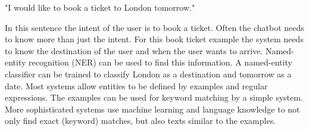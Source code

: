 \begin{center}
"I would like to book a ticket to London tomorrow."
\end{center}

In this sentence the intent of the user is to book a ticket.
Often the chatbot needs to know more than just the intent.
For this book ticket example the system needs to know the destination of the user and when the user wants to arrive.
Named-entity recognition (NER) can be used to find this information.
A named-entity classifier can be trained to classify London as a destination and tomorrow as a date.
Most systems allow entities to be defined by examples and regular expressions.
The examples can be used for keyword matching by a simple system.
More sophisticated systems use machine learning and language knowledge to not only find exact (keyword) matches, but also texts similar to the examples.